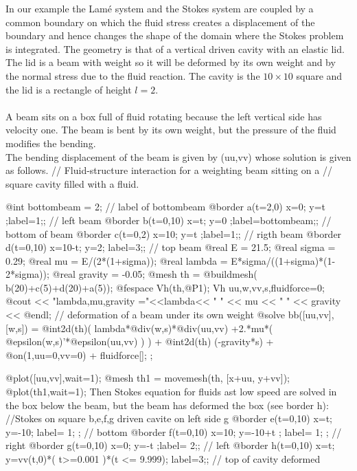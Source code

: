 \documentclass[a4paper,twoside,12pt]{book}
\begin{document}
\begin{example}
In our example the Lam\'{e} system and the Stokes system are coupled by a
common boundary on which
the fluid  stress creates a displacement of the boundary and hence
changes the shape of the domain where the Stokes problem is integrated.
The geometry is that of a vertical driven cavity with an elastic lid.
The lid is a beam with weight so it will
be deformed by its own weight and by the normal stress due to the fluid reaction.
The cavity is the $10 \times 10$ square and the lid is a rectangle of height $l=2$.
\\\\
A beam sits on a box full of fluid rotating because the left vertical side has velocity one.
The beam is bent by its own weight, but the pressure of the fluid modifies the bending.
\\
The bending displacement of the beam is given by (uu,vv) whose solution is
given as follows.
\bFF
//  Fluid-structure interaction for a weighting beam sitting on a
// square cavity filled with a fluid.

@int bottombeam = 2; // label of bottombeam
@border a(t=2,0)  { x=0; y=t ;label=1;};        //  left beam
@border b(t=0,10) { x=t; y=0 ;label=bottombeam;};        //  bottom of beam
@border c(t=0,2)  { x=10; y=t ;label=1;};       //  rigth beam
@border d(t=0,10) { x=10-t; y=2; label=3;};     //  top beam
@real E = 21.5;
@real sigma = 0.29;
@real mu = E/(2*(1+sigma));
@real lambda = E*sigma/((1+sigma)*(1-2*sigma));
@real gravity = -0.05;
@mesh th = @buildmesh( b(20)+c(5)+d(20)+a(5));
@fespace Vh(th,@P1);
Vh uu,w,vv,s,fluidforce=0;
@cout << "lambda,mu,gravity ="<<lambda<< " " << mu << " " << gravity << @endl;
// deformation of a beam under its own weight
@solve  bb([uu,vv],[w,s])  =
    @int2d(th)(
                  lambda*@div(w,s)*@div(uu,vv)
                  +2.*mu*( @epsilon(w,s)'*@epsilon(uu,vv) )
             )
  + @int2d(th) (-gravity*s)
  + @on(1,uu=0,vv=0)
  + fluidforce[];
 ;

 @plot([uu,vv],wait=1);
 @mesh th1 = movemesh(th, [x+uu, y+vv]);
 @plot(th1,wait=1);
\eFF
Then Stokes equation for fluids ast low speed are solved in the box below the beam,
but the beam has deformed the box (see border h):
\bFF
//Stokes on square  b,e,f,g  driven cavite on left side g
@border e(t=0,10) { x=t; y=-10; label= 1; };      //  bottom
@border f(t=0,10) { x=10; y=-10+t ; label= 1; };   //  right
@border g(t=0,10) { x=0; y=-t ;label= 2;};       //  left
@border h(t=0,10) { x=t; y=vv(t,0)*( t>=0.001 )*(t <= 9.999);
                    label=3;};   //  top of cavity deformed


\end{example}
\end{document}
